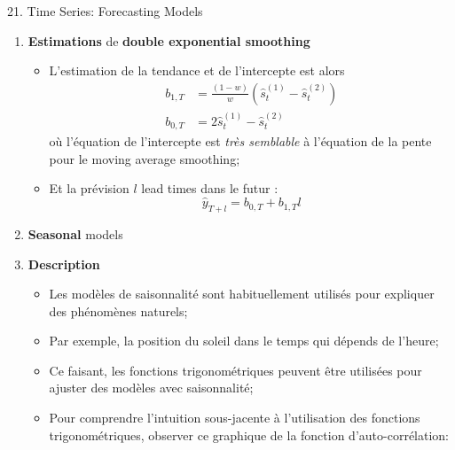 \documentclass[12pt, titlepage, french]{report}
\begin{document}
\begin{CHPT_SUMM}[label = {timeseries21}]{21. Time Series: Forecasting Models}
\begin{enumerate}
\begin{enumerate}
		\item	Créer une \textbf{smoothed series} des valeurs $\hat{s}_{t}^{(1)}$ avec la formule simplifiée réécrite ci-dessous:
			\begin{equation*}
			\hat{s}_{t}^{(1)}	
				=	w \hat{s}^{(1)}_{t - 1} + (1 - w) y_{t}
			\end{equation*}
		\item	Pour	 créer une \textbf{doubly smoothed series}, utiliser l'étape précédente comme input:
			\begin{equation*}
			\hat{s}_{t}^{(2)}	
				=	w \hat{s}^{(2)}_{t - 1} + (1 - w) \hat{s}^{(1)}_{t}
			\end{equation*}
		\end{enumerate}
	\item[]	\textbf{Estimations} de \textbf{double exponential smoothing}
		\begin{itemize}
		\item	L'estimation de la tendance et de l'intercepte est alors
			\begin{align*}
			b_{1, T}	
				&=	\frac{(1 - w)}{w}\left(\hat{s}_{t}^{(1)} - \hat{s}_{t}^{(2)}\right)	\\
			b_{0, T}
				&=	2\hat{s}_{t}^{(1)} - \hat{s}_{t}^{(2)}
			\end{align*}
			où l'équation de l'intercepte est \textit{très semblable} à l'équation de la pente pour le moving average smoothing;
		\item	Et la prévision $l$ lead times dans le futur :
			\begin{equation*}
			\hat{y}_{T + l}
				=	b_{0, T} + b_{1, T} l	
			\end{equation*}
		\end{itemize}
	\item	\textbf{Seasonal} models
	\item[]	\textbf{Description}
		\begin{itemize}
		\item	Les modèles de saisonnalité sont habituellement utilisés pour expliquer des phénomènes naturels;
		\item	Par exemple, la position du soleil dans le temps qui dépends de l'heure;
		\item	Ce faisant, les fonctions trigonométriques peuvent être utilisées pour ajuster des modèles avec saisonnalité;
		\item[]	Pour comprendre l'intuition sous-jacente à l'utilisation des fonctions trigonométriques, observer ce graphique de la fonction d'auto-corrélation:
		

\end{itemize}
\end{enumerate}
\end{CHPT_SUMM}
\end{document}

